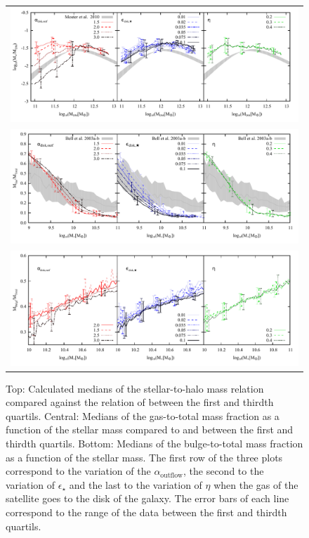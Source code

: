\documentclass[usenatbib]{mn2e}
\begin{document}
\begin{figure}
\centering
\begin{tabular}{c}
\includegraphics{figures/runs/run-v1-13-multiplot-star-frac.pdf} \\
\includegraphics{figures/runs/run-v1-13-multiplot-gas-gfracscatter-quartils.pdf}\\
\includegraphics{figures/runs/run-v1-13-multiplot-bulge.pdf}
\end{tabular}
\caption{Top: Calculated medians of the stellar-to-halo mass relation compared against the relation of \citet{2010ApJ...710..903M} between the first and thirdth quartils. 
Central: Medians of the gas-to-total mass fraction as a  function of the stellar mass compared to \citet{2003ApJS..149..289B} and \citet{2003ApJ...585L.117B} between the 
first and thirdth quartils. Bottom: Medians of the  bulge-to-total mass fraction as a function of the stellar mass. The first
 row of the three plots correspond to the variation of the $\alpha_{\text{outflow}}$, the second to the variation  of $\epsilon_{\star}$ and the last to the 
variation of $\eta$ when the gas of the satellite goes to the disk of the galaxy. The error bars of each line correspond to the range of the data between the first and thirdth
quartils. 
\label{fig:properties-runs-compare}}
\end{figure}
\end{document}
